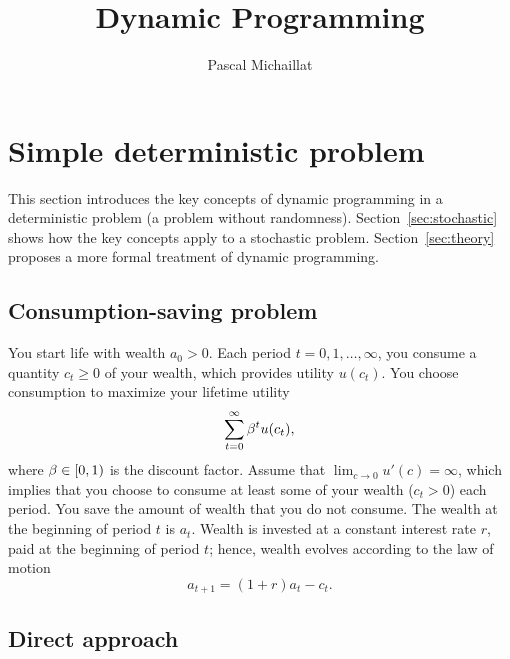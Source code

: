 \documentclass[letterpaper, 11pt, leqno]{article}
\begin{document}
\title{Dynamic Programming}
\author{Pascal Michaillat}
\date{}
\begin{titlepage}
\maketitle
\tableofcontents
\end{titlepage}

\section{Simple deterministic problem}\label{sec:deterministic}

This section introduces the key concepts of dynamic programming in a deterministic problem (a problem without randomness). Section~\ref{sec:stochastic} shows how the key concepts apply to a stochastic problem. Section~\ref{sec:theory} proposes a more formal treatment of dynamic programming.

\subsection{Consumption-saving problem}\label{subsec:PROBLEM}

You start life with wealth $a_0>0$. Each period $t=0,1,\dots,\infty$, you consume a quantity $c_t\ge 0$ of your wealth, which provides utility $u(c_t)$. You choose consumption to maximize your lifetime utility
\begin{equation*}
\sum_{t=0}^{\infty}\beta^t u(c_t),
\end{equation*}
where $\beta\in[0,1)$ is the discount factor. Assume that $\lim_{c\to 0} u'(c)=\infty$, which implies that you choose to consume at least some of your wealth ($c_{t}>0$) each period. You save the amount of wealth that you do not consume. The wealth at the beginning of period $t$ is $a_t$. Wealth is invested at a constant interest rate $r$, paid at the beginning of period $t$; hence, wealth evolves according to the law of motion
\begin{equation*}
a_{t+1}=(1+r) a_t - c_t.
\end{equation*}

\subsection{Direct approach}
\end{document}
